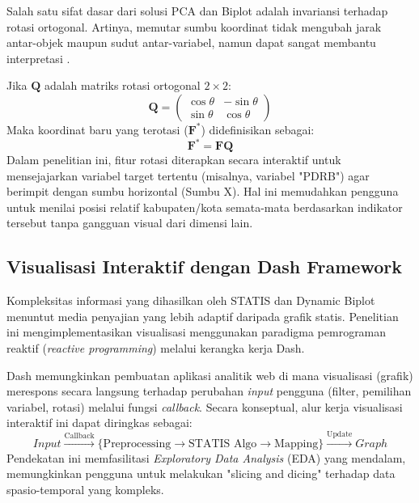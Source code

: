 \documentclass[a4paper]{article}
\theoremstyle{definition} %
\begin{document}
Salah satu sifat dasar dari solusi PCA dan Biplot adalah invariansi terhadap rotasi ortogonal. Artinya, memutar sumbu koordinat tidak mengubah jarak antar-objek maupun sudut antar-variabel, namun dapat sangat membantu interpretasi \citep{kroonenberg2008}.

Jika $\mathbf{Q}$ adalah matriks rotasi ortogonal $2 \times 2$:
\begin{equation}
    \mathbf{Q} = \begin{pmatrix} \cos \theta & -\sin \theta \\ \sin \theta & \cos \theta \end{pmatrix}
\end{equation}
Maka koordinat baru yang terotasi ($\mathbf{F}^*$) didefinisikan sebagai:
\begin{equation}
    \mathbf{F}^* = \mathbf{F} \mathbf{Q}
\end{equation}
Dalam penelitian ini, fitur rotasi diterapkan secara interaktif untuk mensejajarkan variabel target tertentu (misalnya, variabel "PDRB") agar berimpit dengan sumbu horizontal (Sumbu X). Hal ini memudahkan pengguna untuk menilai posisi relatif kabupaten/kota semata-mata berdasarkan indikator tersebut tanpa gangguan visual dari dimensi lain.

\subsection{Visualisasi Interaktif dengan Dash Framework}

Kompleksitas informasi yang dihasilkan oleh STATIS dan Dynamic Biplot menuntut media penyajian yang lebih adaptif daripada grafik statis. Penelitian ini mengimplementasikan visualisasi menggunakan paradigma pemrograman reaktif (\textit{reactive programming}) melalui kerangka kerja Dash.

Dash memungkinkan pembuatan aplikasi analitik web di mana visualisasi (grafik) merespons secara langsung terhadap perubahan \textit{input} pengguna (filter, pemilihan variabel, rotasi) melalui fungsi \textit{callback}. Secara konseptual, alur kerja visualisasi interaktif ini dapat diringkas sebagai:
\begin{equation}
    Input \xrightarrow{\text{Callback}} \{ \text{Preprocessing} \to \text{STATIS Algo} \to \text{Mapping} \} \xrightarrow{\text{Update}} Graph
\end{equation}
Pendekatan ini memfasilitasi \textit{Exploratory Data Analysis} (EDA) yang mendalam, memungkinkan pengguna untuk melakukan "slicing and dicing" terhadap data spasio-temporal yang kompleks.
\end{document}
